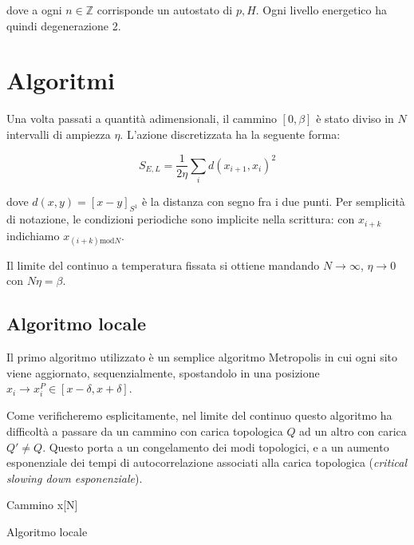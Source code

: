 \documentclass[a4paper,11pt]{article}
\begin{document}
    dove a ogni $n \in \mathbb{Z}$ corrisponde un autostato di $p, H$. Ogni livello energetico ha quindi degenerazione 2.
    
    
    

    
\section{Algoritmi}

    Una volta passati a quantità adimensionali, il cammino $[0, \beta]$ è stato diviso in $N$ intervalli di ampiezza $\eta$. L'azione discretizzata ha la seguente forma:
    
    \begin{equation}
        S_{E,L} = \frac{1}{2\eta} \sum_i d(x_{i+1}, x_{i})^2
    \end{equation}
    
    dove $d(x,y) = [x - y]_{S^1}$ è la distanza con segno fra i due punti. Per semplicità di notazione, le condizioni periodiche sono implicite nella scrittura: con $x_{i+k}$ indichiamo $x_{(i + k) \mathrm{mod} N}$.
    
    Il limite del continuo a temperatura fissata si ottiene mandando $N \to \infty$, $\eta \to 0$ con $N\eta = \beta$.
    
    
    \subsection{Algoritmo locale}
    
    Il primo algoritmo utilizzato è un semplice algoritmo Metropolis in cui ogni sito viene aggiornato, sequenzialmente, spostandolo in una posizione $x_i \to x^P_i \in [x - \delta, x + \delta]$.
    
    Come verificheremo esplicitamente, nel limite del continuo questo algoritmo ha difficoltà a passare da un cammino con carica topologica $Q$ ad un altro con carica $Q' \neq Q$. Questo porta a un congelamento dei modi topologici, e a un aumento esponenziale dei tempi di autocorrelazione associati alla carica topologica (\emph{critical slowing down esponenziale}).
    
    
    \begin{algorithm}[H]
    Cammino x[N]\;
    \caption{Algoritmo locale}
    \label{alg:local}
    \end{algorithm}
    
\end{document}
